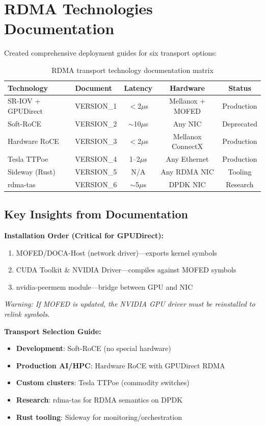 \documentclass[10pt,letterpaper]{article}
\begin{document}
\section{RDMA Technologies Documentation}

Created comprehensive deployment guides for six transport options:

\begin{table}[H]
\centering
\small
\begin{tabular}{@{}llccc@{}}
\toprule
\textbf{Technology} & \textbf{Document} & \textbf{Latency} & \textbf{Hardware} & \textbf{Status} \\
\midrule
SR-IOV + GPUDirect & VERSION\_1 & $<$2$\mu$s & Mellanox + MOFED & Production \\
Soft-RoCE & VERSION\_2 & $\sim$10$\mu$s & Any NIC & Deprecated \\
Hardware RoCE & VERSION\_3 & $<$2$\mu$s & Mellanox ConnectX & Production \\
Tesla TTPoe & VERSION\_4 & 1--2$\mu$s & Any Ethernet & Production \\
Sideway (Rust) & VERSION\_5 & N/A & Any RDMA NIC & Tooling \\
rdma-tas & VERSION\_6 & $\sim$5$\mu$s & DPDK NIC & Research \\
\bottomrule
\end{tabular}
\caption{RDMA transport technology documentation matrix}
\end{table}

\subsection{Key Insights from Documentation}

\textbf{Installation Order (Critical for GPUDirect):}
\begin{enumerate}[noitemsep]
    \item MOFED/DOCA-Host (network driver)---exports kernel symbols
    \item CUDA Toolkit \& NVIDIA Driver---compiles against MOFED symbols
    \item nvidia-peermem module---bridge between GPU and NIC
\end{enumerate}

\textit{Warning: If MOFED is updated, the NVIDIA GPU driver must be reinstalled to relink symbols.}

\textbf{Transport Selection Guide:}
\begin{itemize}[noitemsep]
    \item \textbf{Development}: Soft-RoCE (no special hardware)
    \item \textbf{Production AI/HPC}: Hardware RoCE with GPUDirect RDMA
    \item \textbf{Custom clusters}: Tesla TTPoe (commodity switches)
    \item \textbf{Research}: rdma-tas for RDMA semantics on DPDK
    \item \textbf{Rust tooling}: Sideway for monitoring/orchestration
\end{itemize}
\end{document}
